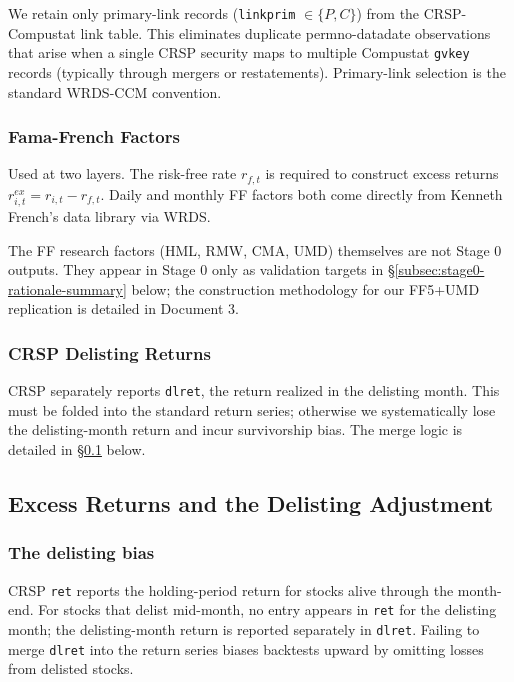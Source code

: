 We retain only primary-link records (\texttt{linkprim} $\in \{P, C\}$)
from the CRSP-Compustat link table. This eliminates duplicate
permno-datadate observations that arise when a single CRSP security
maps to multiple Compustat \texttt{gvkey} records (typically through
mergers or restatements). Primary-link selection is the standard
WRDS-CCM convention.

\subsubsection{Fama-French Factors}

Used at two layers. The risk-free rate \(r_{f,t}\) is required to
construct excess returns
\(r^{ex}_{i,t} = r_{i,t} - r_{f,t}\). Daily and monthly FF factors
both come directly from Kenneth French's data library via WRDS.

The FF research factors (HML, RMW, CMA, UMD) themselves are not
Stage 0 outputs. They appear in Stage 0 only as validation targets
in \S\ref{subsec:stage0-rationale-summary} below; the construction
methodology for our FF5+UMD replication is detailed in Document 3.

\subsubsection{CRSP Delisting Returns}

CRSP separately reports \texttt{dlret}, the return realized in the
delisting month. This must be folded into the standard return series;
otherwise we systematically lose the delisting-month return and incur
survivorship bias. The merge logic is detailed in
\S\ref{subsec:stage0-shumway} below.

\subsection{Excess Returns and the Delisting Adjustment}
\label{subsec:stage0-shumway}

\subsubsection{The delisting bias}

CRSP \texttt{ret} reports the holding-period return for stocks alive
through the month-end. For stocks that delist mid-month, no entry
appears in \texttt{ret} for the delisting month; the delisting-month
return is reported separately in \texttt{dlret}. Failing to merge
\texttt{dlret} into the return series biases backtests upward by
omitting losses from delisted stocks.

